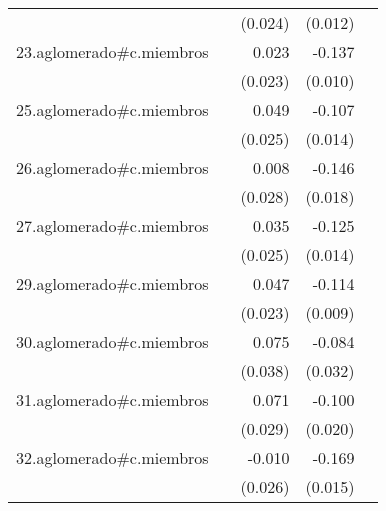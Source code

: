 {\begin{longtable}{l*{4}{D{.}{.}{-1}}}
            &                     &     (0.024)         &     (0.012)         &                     \\
\addlinespace
23.aglomerado#c.miembros&                     &       0.023         &      -0.137\sym{***}&                     \\
            &                     &     (0.023)         &     (0.010)         &                     \\
\addlinespace
25.aglomerado#c.miembros&                     &       0.049         &      -0.107\sym{***}&                     \\
            &                     &     (0.025)         &     (0.014)         &                     \\
\addlinespace
26.aglomerado#c.miembros&                     &       0.008         &      -0.146\sym{***}&                     \\
            &                     &     (0.028)         &     (0.018)         &                     \\
\addlinespace
27.aglomerado#c.miembros&                     &       0.035         &      -0.125\sym{***}&                     \\
            &                     &     (0.025)         &     (0.014)         &                     \\
\addlinespace
29.aglomerado#c.miembros&                     &       0.047\sym{*}  &      -0.114\sym{***}&                     \\
            &                     &     (0.023)         &     (0.009)         &                     \\
\addlinespace
30.aglomerado#c.miembros&                     &       0.075\sym{*}  &      -0.084\sym{**} &                     \\
            &                     &     (0.038)         &     (0.032)         &                     \\
\addlinespace
31.aglomerado#c.miembros&                     &       0.071\sym{*}  &      -0.100\sym{***}&                     \\
            &                     &     (0.029)         &     (0.020)         &                     \\
\addlinespace
32.aglomerado#c.miembros&                     &      -0.010         &      -0.169\sym{***}&                     \\
            &                     &     (0.026)         &     (0.015)         &                     \\

\end{longtable}}

